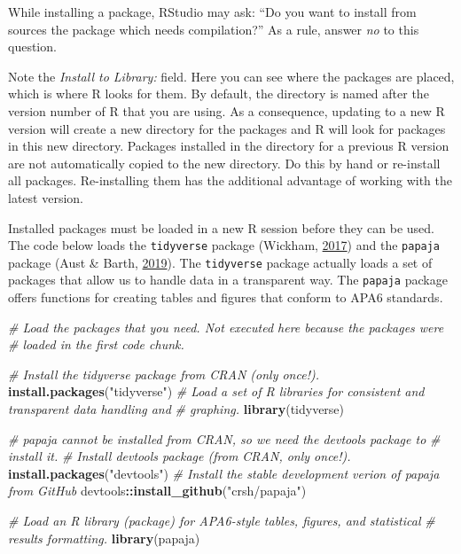 \documentclass[doc,floatsintext]{apa6}
\newenvironment{Shaded}{\begin{snugshade}}{\end{snugshade}}
\newcommand{\KeywordTok}[1]{\textcolor[rgb]{0.13,0.29,0.53}{\textbf{#1}}}
\newcommand{\StringTok}[1]{\textcolor[rgb]{0.31,0.60,0.02}{#1}}
\newcommand{\CommentTok}[1]{\textcolor[rgb]{0.56,0.35,0.01}{\textit{#1}}}
\newcommand{\OperatorTok}[1]{\textcolor[rgb]{0.81,0.36,0.00}{\textbf{#1}}}
\newcommand{\NormalTok}[1]{#1}
\begin{document}
While installing a package, RStudio may ask: \enquote{Do you want to
install from sources the package which needs compilation?} As a rule,
answer \emph{no} to this question.

Note the \emph{Install to Library:} field. Here you can see where the
packages are placed, which is where R looks for them. By default, the
directory is named after the version number of R that you are using. As
a consequence, updating to a new R version will create a new directory
for the packages and R will look for packages in this new directory.
Packages installed in the directory for a previous R version are not
automatically copied to the new directory. Do this by hand or re-install
all packages. Re-installing them has the additional advantage of working
with the latest version.

Installed packages must be loaded in a new R session before they can be
used. The code below loads the \texttt{tidyverse} package (Wickham,
\protect\hyperlink{ref-R-tidyverse}{2017}) and the \texttt{papaja}
package (Aust \& Barth, \protect\hyperlink{ref-R-papaja}{2019}). The
\texttt{tidyverse} package actually loads a set of packages that allow
us to handle data in a transparent way. The \texttt{papaja} package
offers functions for creating tables and figures that conform to APA6
standards.

\begin{Shaded}
\begin{Highlighting}[]
\CommentTok{# Load the packages that you need. Not executed here because the packages were}
\CommentTok{# loaded in the first code chunk.}

\CommentTok{# Install the tidyverse package from CRAN (only once!).}
\KeywordTok{install.packages}\NormalTok{(}\StringTok{"tidyverse"}\NormalTok{)}
\CommentTok{# Load a set of R libraries for consistent and transparent data handling and}
\CommentTok{# graphing.}
\KeywordTok{library}\NormalTok{(tidyverse) }

\CommentTok{# papaja cannot be installed from CRAN, so we need the devtools package to}
\CommentTok{# install it.}
\CommentTok{# Install devtools package (from CRAN, only once!).}
\KeywordTok{install.packages}\NormalTok{(}\StringTok{"devtools"}\NormalTok{)}
\CommentTok{# Install the stable development verion of papaja from GitHub}
\NormalTok{devtools}\OperatorTok{::}\KeywordTok{install_github}\NormalTok{(}\StringTok{"crsh/papaja"}\NormalTok{)}

\CommentTok{# Load an R library (package) for APA6-style tables, figures, and statistical}
\CommentTok{# results formatting.}
\KeywordTok{library}\NormalTok{(papaja) }
\end{Highlighting}
\end{Shaded}
\end{document}
